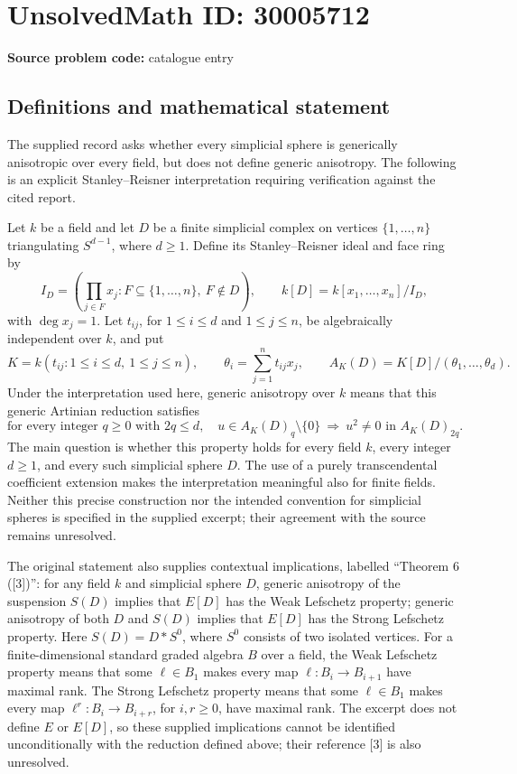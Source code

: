 \documentclass[11pt]{article}
\begin{document}
\section*{UnsolvedMath ID: 30005712}
\textbf{Source problem code:} catalogue entry
\subsection{Definitions and mathematical statement}
The supplied record asks whether every simplicial sphere is generically anisotropic over every field, but does not define generic anisotropy. The following is an explicit Stanley--Reisner interpretation requiring verification against the cited report.

Let \(k\) be a field and let \(D\) be a finite simplicial complex on vertices \(\{1,\ldots,n\}\) triangulating \(S^{d-1}\), where \(d\geq 1\). Define its Stanley--Reisner ideal and face ring by
\[
 I_D=\left(\prod_{j\in F}x_j : F\subseteq\{1,\ldots,n\},\ F\notin D\right),
 \qquad k[D]=k[x_1,\ldots,x_n]/I_D,
\]
with \(\deg x_j=1\). Let \(t_{ij}\), for \(1\leq i\leq d\) and \(1\leq j\leq n\), be algebraically independent over \(k\), and put
\[
 K=k(t_{ij}:1\leq i\leq d,\ 1\leq j\leq n),\qquad
 \theta_i=\sum_{j=1}^{n}t_{ij}x_j,\qquad
 A_K(D)=K[D]/(\theta_1,\ldots,\theta_d).
\]
Under the interpretation used here, generic anisotropy over \(k\) means that this generic Artinian reduction satisfies
\[
 \text{for every integer }q\geq0\text{ with }2q\leq d,
 \quad u\in A_K(D)_q\setminus\{0\}\ \Longrightarrow\ u^2\neq0
 \text{ in }A_K(D)_{2q}.
\]
The main question is whether this property holds for every field \(k\), every integer \(d\geq1\), and every such simplicial sphere \(D\). The use of a purely transcendental coefficient extension makes the interpretation meaningful also for finite fields. Neither this precise construction nor the intended convention for simplicial spheres is specified in the supplied excerpt; their agreement with the source remains unresolved.

The original statement also supplies contextual implications, labelled ``Theorem 6 ([3])'': for any field \(k\) and simplicial sphere \(D\), generic anisotropy of the suspension \(S(D)\) implies that \(E[D]\) has the Weak Lefschetz property; generic anisotropy of both \(D\) and \(S(D)\) implies that \(E[D]\) has the Strong Lefschetz property. Here \(S(D)=D*S^0\), where \(S^0\) consists of two isolated vertices. For a finite-dimensional standard graded algebra \(B\) over a field, the Weak Lefschetz property means that some \(\ell\in B_1\) makes every map \(\ell:B_i\to B_{i+1}\) have maximal rank. The Strong Lefschetz property means that some \(\ell\in B_1\) makes every map \(\ell^r:B_i\to B_{i+r}\), for \(i,r\geq0\), have maximal rank. The excerpt does not define \(E\) or \(E[D]\), so these supplied implications cannot be identified unconditionally with the reduction defined above; their reference [3] is also unresolved.
\end{document}
